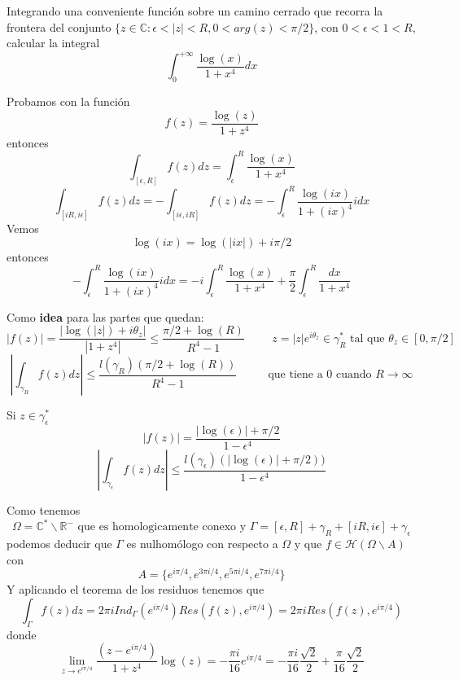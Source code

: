\begin{ejer}
	Integrando una conveniente función sobre un camino cerrado que recorra la frontera del conjunto $\{ z\in\mathbb{C} : \epsilon < |z| < R, 0<arg(z)<\pi/2 \}$, con $0<\epsilon<1<R$, calcular la integral
	$$ \int_{0}^{+\infty} \frac{\log(x)}{1+x^4}dx $$
\end{ejer}
\begin{sol}
	Probamos con la función
	$$ f(z) = \frac{\log(z)}{1+z^4} $$
	entonces
	$$ \int_{[\epsilon, R]}f(z)dz = \int_{\epsilon}^{R} \frac{\log(x)}{1+x^4} $$
	$$ \int_{[iR,i\epsilon]} f(z)dz = -\int_{[i\epsilon,iR]} f(z)dz = -\int_{\epsilon}^{R} \frac{\log(ix)}{1+(ix)^4} idx $$
	Vemos
	$$ \log(ix) = \log(|ix|)+i\pi/2 $$
	entonces
	$$ -\int_{\epsilon}^{R} \frac{\log(ix)}{1+(ix)^4} idx = -i\int_{\epsilon}^{R} \frac{\log(x)}{1+x^4} + \frac{\pi}{2} \int_{\epsilon}^{R} \frac{dx}{1+x^4} $$
	
	Como \textbf{idea} para las partes que quedan:
	$$ |f(z)| = \frac{|\log(|z|)+i\theta_z|}{|1+z^4|} \leq \frac{\pi/2+\log(R)}{R^4-1} \hspace{1cm} z=|z|e^{i\theta_z} \in\gamma_R^{\ast} \text{ tal que }\theta_z\in[0,\pi/2]$$
	$$ \left| \int_{\gamma_R}f(z)dz \right| \leq \frac{l(\gamma_R)(\pi/2+\log(R))}{R^4-1} \hspace{1cm}\text{ que tiene a 0 cuando $R\rightarrow\infty$} $$
	
	Si $z\in\gamma_{\epsilon}^{\ast}$
	$$ |f(z)| = \frac{|\log(\epsilon)|+\pi/2}{1-\epsilon^4} $$
	$$ \left| \int_{\gamma_{\epsilon}} f(z)dz \right| \leq \frac{l(\gamma_{\epsilon}) (|\log(\epsilon)|+\pi/2))}{1-\epsilon^4}  $$
	
	Como tenemos
	$$ \Omega = \mathbb{C}^{\ast}\backslash\mathbb{R}^- \text{ que es homologicamente conexo y }\Gamma = [\epsilon,R] +\gamma_R + [iR,i\epsilon] +\gamma_{\epsilon} $$
	podemos deducir que
	$\Gamma$ es nulhomólogo con respecto a $\Omega$ y que $f\in\mathcal{H}(\Omega\backslash A)$
	con
	$$ A = \{ e^{i\pi/4}, e^{3\pi i/4}, e^{5\pi i/4}, e^{7\pi i/4} \} $$
	Y aplicando el teorema de los residuos tenemos que
	$$ \int_{\Gamma}f(z)dz = 2\pi i Ind_{\Gamma}(e^{i\pi/4}) Res(f(z),e^{i\pi/4}) = 2\pi i Res(f(z),e^{i\pi/4}) $$
	donde
	$$ \lim_{z\rightarrow e^{i\pi/4}} \frac{(z-e^{i\pi/4})}{1+z^4}\log(z) = -\frac{\pi i}{16}e^{i\pi/4} = -\frac{\pi i}{16}\frac{\sqrt{2}}{2} + \frac{\pi}{16}\frac{\sqrt{2}}{2} $$
\end{sol}

